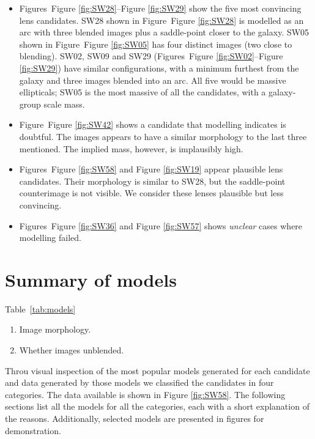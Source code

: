 \documentclass[fleqn,usenatbib]{mnras}
\newcommand{\figref}[1]{Figure \ref{fig:#1}}
\begin{document}
\begin{itemize}

\item Figures~\figref{SW28}--\figref{SW29} show the five most
  convincing lens candidates. SW28 shown in Figure~\figref{SW28} is
  modelled as an arc with three blended images plus a saddle-point
  closer to the galaxy.  SW05 shown in Figure~\figref{SW05} has four
  distinct images (two close to blending).  SW02, SW09 and SW29
  (Figures~\figref{SW02}--\figref{SW29}) have similar
  configurations, with a minimum furthest from the galaxy and three
  images blended into an arc.  All five would be massive ellipticals;
  SW05 is the most massive of all the candidates, with a galaxy-group
  scale mass.

\item Figure~\figref{SW42} shows a candidate that modelling indicates
  is doubtful.  The images appears to have a similar morphology to the
  last three mentioned.  The implied mass, however, is implausibly
  high.

\item Figures~\figref{SW58} and \figref{SW19} appear plausible lens
  candidates.  Their morphology is similar to SW28, but the
  saddle-point counterimage is not visible.  We consider these lenses
  plausible but less convincing.

\item Figures~\figref{SW36} and \figref{SW57} shows {\em unclear\/}
  cases where modelling failed.

\end{itemize}

\section{Summary of models}

Table~\ref{tab:models} 

\begin{enumerate}
\item Image morphology.
\item Whether images unblended.
\end{enumerate}

Throu visual inspection of the most popular models generated for each candidate and data generated by those models we classified the candidates in four categories.
The data available is shown in \figref{SW58}.
The following sections list all the models for all the categories, each with a short explanation of the reasons.
Additionally, selected models are presented in figures for demonstration.
\end{document}
